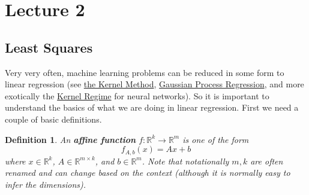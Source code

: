 \documentclass[letterpaper, 12pt]{article}
\newcommand{\R}{\mathbb{R}}	%
\newcommand{\1}{\mathds{1}}	%
\newtheorem{definition}{Definition}[section]
\begin{document}
\section{Lecture 2}
\label{sec:Lecture 2}
\subsection{Least Squares}
Very very often, machine learning problems can be reduced in some form to linear regression (see \href{https://en.wikipedia.org/wiki/Kernel_method}{the Kernel Method}, \href{https://en.wikipedia.org/wiki/Kriging}{Gaussian Process Regression}, and more exotically the \href{https://arxiv.org/pdf/1811.03962}{Kernel Regime} for neural networks). 
So it is important to understand the basics of what we are doing in linear regression. First we need a couple of basic definitions.

\begin{definition}
    \label{def:affine function}
    An \textbf{affine function} \(f: \R^k \to \R^m\) is one of the form
    \[
        f_{A,b}(x) = Ax + b
    \]
    where \(x\in\R^k\), \(A\in\R^{m\times k}\), and \(b \in \R^m\). Note that notationally \(m,k\) are often renamed and can change based on the context (although it is normally easy to infer the dimensions).
\end{definition}
\end{document}
